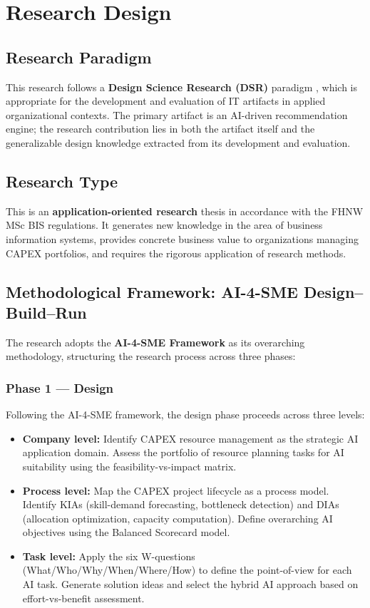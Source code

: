 \chapter{Research Design}
\label{chap:research_design}

\section{Research Paradigm}
\label{sec:paradigm}

This research follows a \textbf{Design Science Research (DSR)} paradigm \citep{hevner2004design}, which is appropriate for the development and evaluation of IT artifacts in applied organizational contexts. The primary artifact is an AI-driven recommendation engine; the research contribution lies in both the artifact itself and the generalizable design knowledge extracted from its development and evaluation.

\section{Research Type}
\label{sec:type}

This is an \textbf{application-oriented research} thesis in accordance with the FHNW MSc BIS regulations. It generates new knowledge in the area of business information systems, provides concrete business value to organizations managing CAPEX portfolios, and requires the rigorous application of research methods.

\section{Methodological Framework: AI-4-SME Design–Build–Run}
\label{sec:ai4sme_structure}

The research adopts the \textbf{AI-4-SME Framework} \citep{peter2025ai4sme} as its overarching methodology, structuring the research process across three phases:

\subsection*{Phase 1 — Design}

Following the AI-4-SME framework, the design phase proceeds across three levels:

\begin{itemize}
  \item \textbf{Company level:} Identify CAPEX resource management as the strategic AI application domain. Assess the portfolio of resource planning tasks for AI suitability using the feasibility-vs-impact matrix.
  \item \textbf{Process level:} Map the CAPEX project lifecycle as a process model. Identify KIAs (skill-demand forecasting, bottleneck detection) and DIAs (allocation optimization, capacity computation). Define overarching AI objectives using the Balanced Scorecard model.
  \item \textbf{Task level:} Apply the six W-questions (What/Who/Why/When/Where/How) to define the point-of-view for each AI task. Generate solution ideas and select the hybrid AI approach based on effort-vs-benefit assessment.
\end{itemize}

